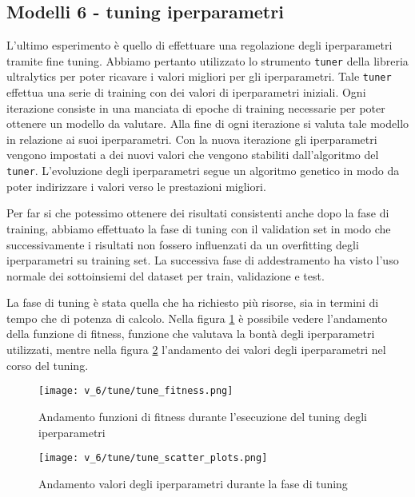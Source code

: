 \subsection*{Modelli 6 - tuning iperparametri}

L'ultimo esperimento è quello di effettuare una regolazione degli iperparametri tramite 
fine tuning. Abbiamo pertanto utilizzato lo strumento \texttt{tuner} della libreria ultralytics
per poter ricavare i valori migliori per gli iperparametri. Tale \texttt{tuner} effettua una serie 
di training con dei valori di iperparametri iniziali. Ogni iterazione consiste in una manciata
di epoche  di training necessarie per poter ottenere un modello da valutare. Alla fine di ogni 
iterazione si valuta tale modello in relazione ai suoi iperparametri. Con la nuova iterazione 
gli iperparametri vengono impostati a dei nuovi valori che vengono stabiliti dall'algoritmo del
\texttt{tuner}. L'evoluzione degli iperparametri segue un algoritmo genetico in modo da poter 
indirizzare i valori verso le prestazioni migliori.

Per far si che potessimo ottenere dei risultati consistenti anche dopo la fase di training, 
abbiamo effettuato la fase di tuning con il validation set in modo che successivamente i 
risultati non fossero influenzati da un overfitting degli iperparametri su training set.
La successiva fase di addestramento ha visto l'uso normale dei sottoinsiemi del dataset per 
train, validazione e test.

La fase di tuning è stata quella che ha richiesto più risorse, sia in termini di tempo che di 
potenza di calcolo. Nella figura \ref{fig:v6-1} è possibile vedere l'andamento della funzione 
di fitness, funzione che valutava la bontà degli iperparametri utilizzati, mentre nella figura 
\ref{fig:v6-2} l'andamento dei valori degli iperparametri nel corso del tuning.

\begin{figure}[!htb]
    \centering
    \texttt{[image: v\_6/tune/tune\_fitness.png]}
    \caption{Andamento funzioni di fitness durante l'esecuzione del tuning degli iperparametri}
    \label{fig:v6-1}
\end{figure}

\begin{figure}[!htb]
    \centering
    \texttt{[image: v\_6/tune/tune\_scatter\_plots.png]}
    \caption{Andamento valori degli iperparametri durante la fase di tuning}
    \label{fig:v6-2}
\end{figure}

